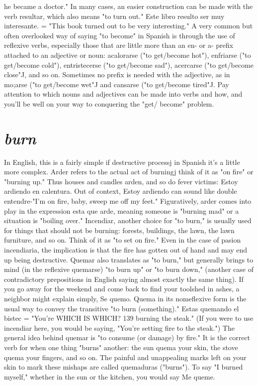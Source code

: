 he became a doctor." In many cases, an easier construction can be
made with the verb resultar, which also means "to turn out." Este libro resulto ser muy interesante. = "This book turned out to be very
interesting."
A very common but often overlooked way of saying "to become" in Spanish is through the use of reflexive verbs, especially those
that are little more than an en- or a- prefix attached to an adjective or
noun: acalorarse ("to get/become hot"), enfriarse ("to get/become
cold"), entristecerse ("to get/become sad"), acercarse ("to get/become
close"J, and so on. Sometimes no prefix is needed with the adjective,
as in mo;arse ("to get/become wet"J and cansarse ("to get/become
tired"J. Pay attention to which nouns and adjectives can be made into
verbs and how, and you'll be well on your way to conquering the "get/
become" problem.

\section{\emph{burn}}

In English, this is a fairly simple if destructive processj in
Spanish it's a little more complex. Arder refers to the actual act of
burningj think of it as "on fire" or "burning up." Thus houses and
candles arden, and so do fever victims: Estoy ardiendo en calentura.
Out of context, Estoy ardiendo can sound like double entendre-"I'm
on fire, baby, sweep me off my feet." Figuratively, arder comes into
play in the expression esta que arde, meaning someone is "burning
mad" or a situation is "boiling over."
Incendiar, another choice for "to burn," is usually used for
things that should not be burning: forests, buildings, the lawn, the
lawn furniture, and so on. Think of it as "to set on fire." Even in the
case of pasion incendiaria, the implication is that the fire has gotten
out of hand and may end up being destructive.
Quemar also translates as "to burn," but generally brings to
mind (in the reflexive quemarse) "to burn up" or "to burn down," (another case of contradictory prepositions in English saying almost exactly the same thing). If you go away for the weekend and come back
to find your toolshed in ashes, a neighbor might explain simply, Se
quemo. Quema in its nomeflexive form is the usual way to convey the
transitive "to burn (something)." Estas quemando el bistec = "You're
WHICH IS WHICH? 139
burning the steak." (If you were to use incendiar here, you would be
saying, "You're setting fire to the steak.") The general idea behind quemar is "to consume (or damage) by fire." It is the correct verb for when
one thing "burns" another: the sun quema your skin, the stove quema
your fingers, and so on. The painful and unappealing marks left on
your skin to mark these mishaps are called quemaduras ("burns"). To
say "I burned myself," whether in the sun or the kitchen, you would
say Me queme.

